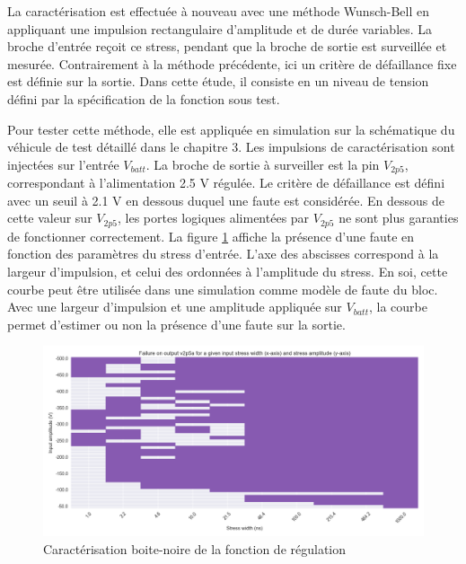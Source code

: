 La caractérisation est effectuée à nouveau avec une méthode Wunsch-Bell \cite{wunsch-bell} en appliquant une impulsion rectangulaire d'amplitude et de durée variables.
La broche d'entrée reçoit ce stress, pendant que la broche de sortie est surveillée et mesurée.
Contrairement à la méthode précédente, ici un critère de défaillance fixe est définie sur la sortie.
Dans cette étude, il consiste en un niveau de tension défini par la spécification de la fonction sous test.

Pour tester cette méthode, elle est appliquée en simulation sur la schématique du véhicule de test détaillé dans le chapitre 3.
Les impulsions de caractérisation sont injectées sur l'entrée $V_{batt}$.
La broche de sortie à surveiller est la pin $V_{2p5}$, correspondant à l'alimentation 2.5 V régulée.
Le critère de défaillance est défini avec un seuil à 2.1 V en dessous duquel une faute est considérée.
En dessous de cette valeur sur $V_{2p5}$, les portes logiques alimentées par $V_{2p5}$ ne sont plus garanties de fonctionner correctement.
La figure \ref{fig:cz-black-box} affiche la présence d'une faute en fonction des paramètres du stress d'entrée.
L'axe des abscisses correspond à la largeur d'impulsion, et celui des ordonnées à l'amplitude du stress.
En soi, cette courbe peut être utilisée dans une simulation comme modèle de faute du bloc.
Avec une largeur d'impulsion et une amplitude appliquée sur $V_{batt}$, la courbe permet d'estimer ou non la présence d'une faute sur la sortie.

\begin{figure}[!h]
  \centering
  \includegraphics[width=\textwidth]{src/1/figures/black_box_regulator.png}
  \caption{Caractérisation boite-noire de la fonction de régulation}
  \label{fig:cz-black-box}
\end{figure}


